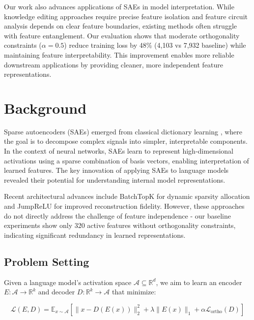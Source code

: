 \documentclass{article} %
\begin{document}
Our work also advances applications of SAEs in model interpretation. While knowledge editing approaches \cite{farellApplyingSparseAutoencoders2024} require precise feature isolation and feature circuit analysis \cite{marksSparseFeatureCircuits2024} depends on clear feature boundaries, existing methods often struggle with feature entanglement. Our evaluation shows that moderate orthogonality constraints ($\alpha=0.5$) reduce training loss by 48\% (4,103 vs 7,932 baseline) while maintaining feature interpretability. This improvement enables more reliable downstream applications by providing cleaner, more independent feature representations.

\section{Background}
\label{sec:background}

Sparse autoencoders (SAEs) emerged from classical dictionary learning \cite{Coates2011AnAO}, where the goal is to decompose complex signals into simpler, interpretable components. In the context of neural networks, SAEs learn to represent high-dimensional activations using a sparse combination of basis vectors, enabling interpretation of learned features. The key innovation of applying SAEs to language models \cite{gaoScalingEvaluatingSparse} revealed their potential for understanding internal model representations.

Recent architectural advances include BatchTopK \cite{bussmannBatchTopKSparseAutoencoders2024} for dynamic sparsity allocation and JumpReLU \cite{rajamanoharanJumpingAheadImproving2024} for improved reconstruction fidelity. However, these approaches do not directly address the challenge of feature independence - our baseline experiments show only 320 active features without orthogonality constraints, indicating significant redundancy in learned representations.

\subsection{Problem Setting}
Given a language model's activation space $\mathcal{A} \subseteq \mathbb{R}^d$, we aim to learn an encoder $E: \mathcal{A} \rightarrow \mathbb{R}^k$ and decoder $D: \mathbb{R}^k \rightarrow \mathcal{A}$ that minimize:

\begin{equation}
\mathcal{L}(E,D) = \mathbb{E}_{x \sim \mathcal{A}} \left[ \|x - D(E(x))\|_2^2 + \lambda \|E(x)\|_1 + \alpha \mathcal{L}_{\text{ortho}}(D) \right]
\end{equation}
\end{document}
